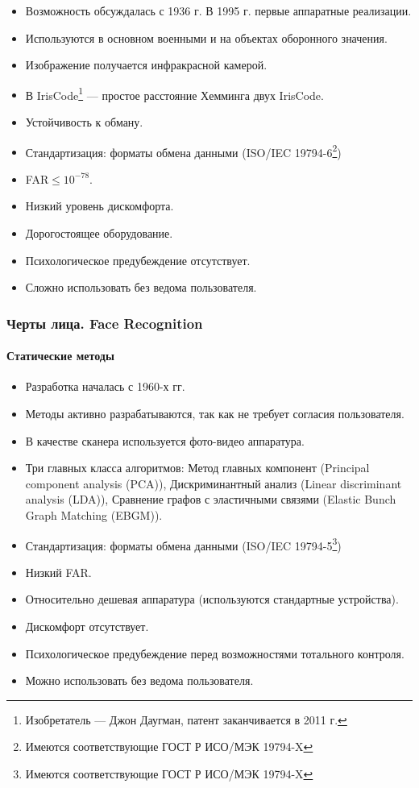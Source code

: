 \begin{frame}[allowframebreaks]
\begin{itemize}
    \item Возможность обсуждалась с 1936 г. В 1995 г. первые аппаратные реализации.
    \item Используются в основном военными и на объектах оборонного значения.
    \item Изображение получается инфракрасной камерой.
    \item В IrisCode\textregistered\footnote{Изобретатель --- Джон Даугман, патент заканчивается в 2011 г.} --- простое расстояние Хемминга двух IrisCode\textregistered.
    \item Устойчивость к обману.
    \item Стандартизация: форматы обмена данными (ISO/IEC 19794-6\footnote{Имеются соответствующие ГОСТ Р ИСО/МЭК 19794-X}) 
    \item FAR$\leq 10^{-78}$.
    \item Низкий уровень дискомфорта.
    \item Дорогостоящее оборудование.
    \item Психологическое предубеждение отсутствует.
    \item Сложно использовать без ведома пользователя.
\end{itemize}
\end{frame}




\begin{frame}[allowframebreaks]
\frametitle{Черты лица. Face Recognition}
\framesubtitle{Статические методы}

\begin{itemize}
    \item Разработка началась с 1960-х гг.
    \item Методы активно разрабатываются, так как не требует согласия пользователя.
    \item В качестве сканера используется фото-видео аппаратура.
    \item Три главных класса алгоритмов: Метод главных компонент (Principal component analysis (PCA)), Дискриминантный анализ (Linear discriminant analysis (LDA)), Сравнение графов с эластичными связями (Elastic Bunch Graph Matching (EBGM)).
    \item Стандартизация: форматы обмена данными (ISO/IEC 19794-5\footnote{Имеются соответствующие ГОСТ Р ИСО/МЭК 19794-X}) 
    \item Низкий FAR.
    \item Относительно дешевая аппаратура (используются стандартные устройства).
    \item Дискомфорт отсутствует.
    \item Психологическое предубеждение перед возможностями тотального контроля.
    \item Можно использовать без ведома пользователя.
\end{itemize}
\end{frame}


